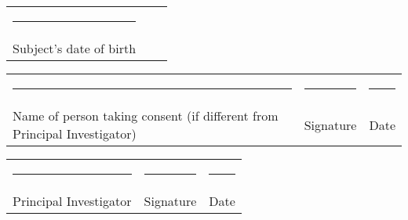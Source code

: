 \documentclass[a4paper,10pt]{article}
\begin{document}
\vspace{0.6cm}

 \begin{tabular}{p{4cm}p{4cm}p{4cm}}
    \rule{10em}{.3pt} & &  \\
     Subject's date of birth  & &  \\
 \end{tabular}

\vspace{0.6cm}

 \begin{tabular}{p{4cm}p{4cm}p{4cm}}
    \rule{10em}{.3pt} & \rule{10em}{.3pt} & \rule{10em}{.3pt} \\
     Name of person taking consent (if different from Principal Investigator) & Signature &  Date \\
\end{tabular}

\vspace{0.6cm}

 \begin{tabular}{p{4cm}p{4cm}p{4cm}}
    \rule{10em}{.3pt} & \rule{10em}{.3pt} & \rule{10em}{.3pt} \\
     Principal Investigator & Signature &  Date \\
 \end{tabular}
\end{document}
